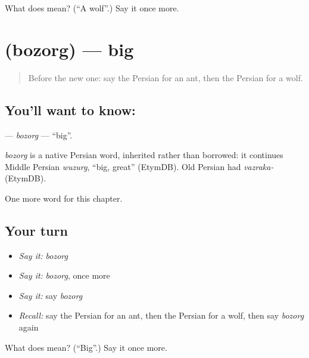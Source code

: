 \begin{tcolorbox}[breakable,colback=teal!4,colframe=teal!35!black,title={Before you move on}]
What does  mean? (\textquotedblleft{}A wolf\textquotedblright{}.) Say it once more.
\end{tcolorbox}
\section[\texorpdfstring{\fa{بزرگ} (bozorg)}{بزرگ (bozorg)}]{ (bozorg) — big}

\label{lesson:FA-C58-bozorg}



\begin{quote}
Before the new one: say the Persian for an ant, then the Persian for a wolf.
\end{quote}

\subsection*{You'll want to know: }
\textbf{} — \emph{bozorg} — \textquotedblleft{}big\textquotedblright{}.

\begin{cousinweb}
\emph{bozorg} is a native Persian word, inherited rather than borrowed: it continues Middle Persian \emph{wuzurg}, \textquotedblleft{}big, great\textquotedblright{} (EtymDB). Old Persian had \emph{vazraka-} (EtymDB).
\end{cousinweb}

\begin{grammarlens}[title={What you've built}]
One more word for this chapter.
\end{grammarlens}

\subsection*{Your turn}
\begin{itemize}
\raggedright
  \item \emph{Say it:} \emph{bozorg}
  \item \emph{Say it:} \emph{bozorg}, once more
  \item \emph{Say it:} say \emph{bozorg}
  \item \emph{Recall:} say the Persian for an ant, then the Persian for a wolf, then say \emph{bozorg} again
\end{itemize}

\begin{tcolorbox}[breakable,colback=teal!4,colframe=teal!35!black,title={Before you move on}]
What does  mean? (\textquotedblleft{}Big\textquotedblright{}.) Say it once more.
\end{tcolorbox}
